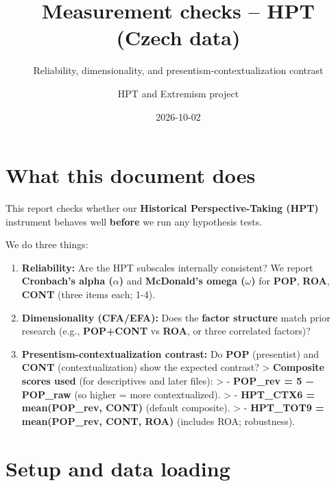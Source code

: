\documentclass[
  10pt,
]{article}
\title{Measurement checks -- HPT (Czech data)}
\subtitle{Reliability, dimensionality, and presentism-contextualization
contrast}
\author{HPT and Extremism project}
\date{2026-10-02}
\providecommand{\tightlist}{%
  \setlength{\itemsep}{0pt}\setlength{\parskip}{0pt}}
\begin{document}
\maketitle

{
\setcounter{tocdepth}{3}
\tableofcontents
}
\hypertarget{what-this-document-does}{%
\section{What this document does}\label{what-this-document-does}}

This report checks whether our \textbf{Historical Perspective-Taking
(HPT)} instrument behaves well \textbf{before} we run any hypothesis
tests.

We do three things:

\begin{enumerate}
\def\labelenumi{\arabic{enumi}.}
\tightlist
\item
  \textbf{Reliability:} Are the HPT subscales internally consistent? We
  report \textbf{Cronbach's alpha (\(\alpha\))} and \textbf{McDonald's
  omega (\(\omega\))} for \textbf{POP}, \textbf{ROA}, \textbf{CONT}
  (three items each; 1-4).
\item
  \textbf{Dimensionality (CFA/EFA):} Does the \textbf{factor structure}
  match prior research (e.g., \textbf{POP+CONT} vs \textbf{ROA}, or
  three correlated factors)?
\item
  \textbf{Presentism-contextualization contrast:} Do \textbf{POP}
  (presentist) and \textbf{CONT} (contextualization) show the expected
  contrast? \textgreater{} \textbf{Composite scores used} (for
  descriptives and later files): \textgreater{} - \textbf{POP\_rev = 5 −
  POP\_raw} (so higher = more contextualized). \textgreater{} -
  \textbf{HPT\_CTX6 = mean(POP\_rev, CONT)} (default composite).
  \textgreater{} - \textbf{HPT\_TOT9 = mean(POP\_rev, CONT, ROA)}
  (includes ROA; robustness).
\end{enumerate}

\hypertarget{setup-and-data-loading}{%
\section{Setup and data loading}\label{setup-and-data-loading}}
\end{document}
